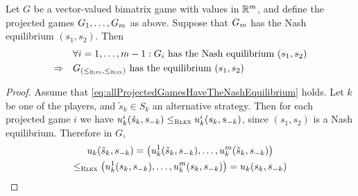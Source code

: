 \documentclass[a4paper]{scrreprt}
\begin{document}
    \begin{thm}
        Let $G$ be a vector-valued bimatrix game with values in $\mathbb{R}^m$, and define the projected games $G_{1}, \dots, G_{m}$ as above.
        Suppose that $G_{m}$ has the 
        Nash equilibrium $(s_1, s_2)$.    
        Then
        \begin{align}
            \label{eq:allProjectedGamesHaveTheNashEquilibrium}
                            &\forall i = 1, \dots, m-1: G_{i} \text{ has the Nash equilibrium } (s_1, s_2) \\
            \Rightarrow\quad &G_{(\leq_{\textsc{Rlex}},\leq_{\textsc{Rlex}})} \text{ has the equilibrium } (s_1, s_2)
        \end{align}
        \label{thm:rlexGameProjectedGameSufficientCondition}
    \end{thm}
    \begin{proof}
        Assume that \eqref{eq:allProjectedGamesHaveTheNashEquilibrium} holds.
        Let $k$ be one of the players, and $\tilde{s}_k \in S_k$ an alternative strategy.
        Then for each projected game $i$ we have $u_k^{i}(\tilde{s}_k, s_{-k}) \leq_{\textsc{Rlex}} u_k^{i}(s_k, s_{-k})$, since $(s_1, s_2)$ is a Nash equilibrium.
        Therefore in $G$,
        \begin{multline*}
            u_k(\tilde{s}_k, s_{-k}) 
            = \bigl(u_k^{1}(\tilde{s}_k, s_{-k}), \dots, u_k^{m}(\tilde{s}_k, s_{-k})\bigr) \\
            \leq_{\textsc{Rlex}} \bigl(u_k^{1}(s_k, s_{-k}), \dots, u_k^{m}(s_k, s_{-k})\bigr)
            = u_k(s_k, s_{-k}) 
        \end{multline*}
    \end{proof}
\end{document}
